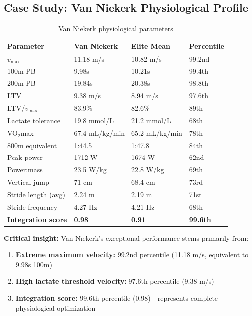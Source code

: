 \subsection{Case Study: Van Niekerk Physiological Profile}

\begin{table}[H]
\centering
\caption{Van Niekerk physiological parameters}
\small
\begin{tabular}{@{}llll@{}}
\toprule
\textbf{Parameter} & \textbf{Van Niekerk} & \textbf{Elite Mean} & \textbf{Percentile} \\
\midrule
$v_{\max}$ & 11.18 m/s & 10.82 m/s & 99.2nd \\
100m PB & 9.98s & 10.21s & 99.4th \\
200m PB & 19.84s & 20.38s & 98.8th \\
\midrule
LTV & 9.38 m/s & 8.94 m/s & 97.6th \\
LTV/$v_{\max}$ & 83.9\% & 82.6\% & 89th \\
Lactate tolerance & 19.8 mmol/L & 21.2 mmol/L & 68th \\
\midrule
VO$_2$max & 67.4 mL/kg/min & 65.2 mL/kg/min & 78th \\
800m equivalent & 1:44.5 & 1:47.8 & 84th \\
\midrule
Peak power & 1712 W & 1674 W & 62nd \\
Power:mass & 23.5 W/kg & 22.8 W/kg & 69th \\
Vertical jump & 71 cm & 68.4 cm & 73rd \\
\midrule
Stride length (avg) & 2.24 m & 2.19 m & 71st \\
Stride frequency & 4.27 Hz & 4.21 Hz & 68th \\
\midrule
\textbf{Integration score} & \textbf{0.98} & \textbf{0.91} & \textbf{99.6th} \\
\bottomrule
\end{tabular}
\end{table}

\textbf{Critical insight:} Van Niekerk's exceptional performance stems primarily from:
\begin{enumerate}
    \item \textbf{Extreme maximum velocity:} 99.2nd percentile (11.18 m/s, equivalent to 9.98s 100m)
    \item \textbf{High lactate threshold velocity:} 97.6th percentile (9.38 m/s)
    \item \textbf{Integration score:} 99.6th percentile (0.98)—represents complete physiological optimization
\end{enumerate}

